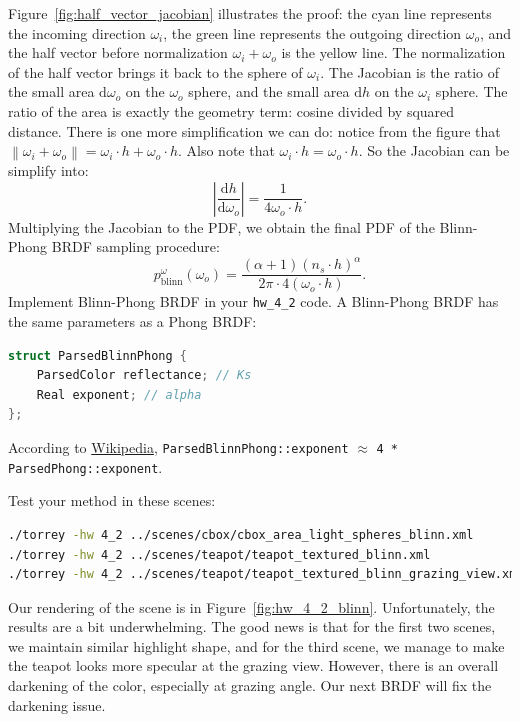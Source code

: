 Figure~\ref{fig:half_vector_jacobian} illustrates the proof: the cyan line represents the incoming direction $\omega_i$, the green line represents the outgoing direction $\omega_o$, and the half vector before normalization $\omega_i + \omega_o$ is the yellow line. The normalization of the half vector brings it back to the sphere of $\omega_i$. The Jacobian is the ratio of the small area $\mathrm{d}\omega_o$ on the $\omega_o$ sphere, and the small area $\mathrm{d}h$ on the $\omega_i$ sphere. The ratio of the area is exactly the geometry term: cosine divided by squared distance.
There is one more simplification we can do: notice from the figure that $\left\|\omega_i + \omega_o\right\| = \omega_i \cdot h + \omega_o \cdot h$. Also note that $\omega_i \cdot h = \omega_o \cdot h$. So the Jacobian can be simplify into:
\begin{equation}
\left|\frac{\mathrm{d}h}{\mathrm{d}\omega_o}\right| = \frac{1}{4 \omega_o \cdot h}.
\end{equation}
Multiplying the Jacobian to the PDF, we obtain the final PDF of the Blinn-Phong BRDF sampling procedure:
\begin{equation}
p_{\text{blinn}}^{\omega}(\omega_o) = \frac{\left(\alpha + 1\right) \left(n_s \cdot h\right)^{\alpha}}{2\pi \cdot 4 \left(\omega_o \cdot h\right)}.
\end{equation}
Implement Blinn-Phong BRDF in your \lstinline{hw_4_2} code. A Blinn-Phong BRDF has the same parameters as a Phong BRDF:
\begin{lstlisting}[language=C++]
struct ParsedBlinnPhong {
    ParsedColor reflectance; // Ks
    Real exponent; // alpha
};
\end{lstlisting}
According to \href{https://en.wikipedia.org/wiki/Blinn%E2%80%93Phong_reflection_model}{Wikipedia}, \lstinline{ParsedBlinnPhong::exponent} $\approx$ \lstinline{4 * ParsedPhong::exponent}.

Test your method in these scenes:
\begin{lstlisting}[language=bash]
./torrey -hw 4_2 ../scenes/cbox/cbox_area_light_spheres_blinn.xml
./torrey -hw 4_2 ../scenes/teapot/teapot_textured_blinn.xml
./torrey -hw 4_2 ../scenes/teapot/teapot_textured_blinn_grazing_view.xml
\end{lstlisting}
Our rendering of the scene is in Figure~\ref{fig:hw_4_2_blinn}. Unfortunately, the results are a bit underwhelming. The good news is that for the first two scenes, we maintain similar highlight shape, and for the third scene, we manage to make the teapot looks more specular at the grazing view. However, there is an overall darkening of the color, especially at grazing angle. Our next BRDF will fix the darkening issue.

